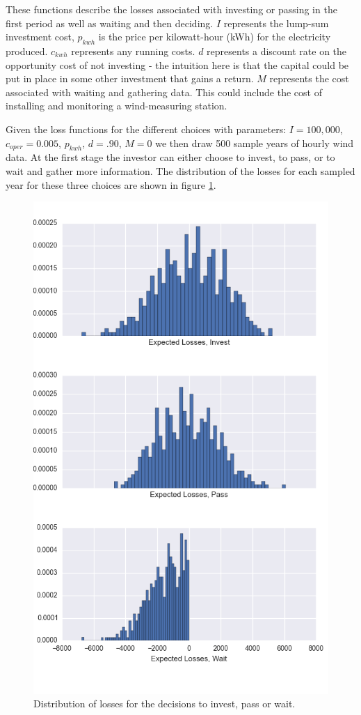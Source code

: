 \documentclass[11pt]{article}
\begin{document}
These functions describe the losses associated with investing or passing in the first period as well as waiting and then deciding. $I$ represents the lump-sum investment cost, $p_{kwh}$ is the price per kilowatt-hour (kWh) for the electricity produced. $c_{kwh}$ represents any running costs. $d$ represents a discount rate on the opportunity cost of not investing - the intuition here is that the capital could be put in place in some other investment that gains a return. $M$ represents the cost associated with waiting and gathering data. This could include the cost of installing and monitoring a wind-measuring station.

Given the loss functions for the different choices with parameters: $I=100,000$, $c_{oper}=0.005$, $p_{kwh}$, $d=.90$, $M=0$ we then draw 500 sample years of hourly wind data. At the first stage the investor can either choose to invest, to pass, or to wait and gather more information. The distribution of the losses for each sampled year for these three choices are shown in figure \ref{losses}.

\begin{figure}
	\centering
	\includegraphics[width=.8\textwidth]{figures/losses.png}
	\caption{Distribution of losses for the decisions to invest, pass or wait.}
	\label{losses}
\end{figure}
\end{document}
